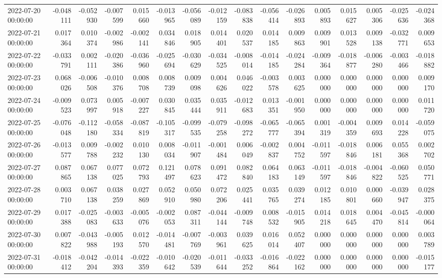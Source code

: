 \begin{tabular}{lrrrrrrrrrrrrrrr}
2022-07-20 00:00:00 & -0.048111 & -0.052930 & -0.007599 & 0.015660 & -0.013965 & -0.056089 & -0.012159 & -0.083838 & -0.056414 & -0.026893 & 0.005893 & 0.015627 & 0.005306 & -0.025636 & -0.024368 \\
2022-07-21 00:00:00 & 0.017364 & 0.010374 & -0.002986 & -0.002141 & 0.034846 & 0.018905 & 0.014401 & 0.020537 & 0.014185 & 0.009863 & 0.009901 & 0.013528 & 0.009138 & -0.032771 & 0.009653 \\
2022-07-22 00:00:00 & -0.033791 & 0.002111 & -0.020386 & -0.036960 & -0.025694 & -0.030629 & -0.034525 & -0.008014 & -0.014185 & -0.024284 & -0.009364 & -0.018877 & -0.006280 & -0.003466 & -0.018882 \\
2022-07-23 00:00:00 & 0.068026 & -0.006508 & -0.010376 & 0.008708 & 0.008739 & 0.009098 & 0.004626 & 0.046022 & -0.003578 & 0.003625 & 0.000000 & 0.000000 & 0.000000 & 0.000000 & 0.009170 \\
2022-07-24 00:00:00 & -0.009523 & 0.073997 & 0.005918 & -0.007227 & 0.030845 & 0.035444 & 0.035911 & -0.012683 & 0.013351 & -0.001950 & 0.000000 & 0.000000 & 0.000000 & 0.000000 & 0.011720 \\
2022-07-25 00:00:00 & -0.076048 & -0.112180 & -0.058334 & -0.087819 & -0.105317 & -0.099535 & -0.079258 & -0.098272 & -0.065777 & -0.065394 & 0.001319 & -0.004359 & 0.009693 & 0.014228 & -0.059075 \\
2022-07-26 00:00:00 & -0.013577 & 0.009788 & -0.002232 & 0.010130 & 0.008034 & -0.011907 & -0.001484 & 0.006049 & -0.002837 & 0.004752 & -0.011597 & -0.018846 & 0.006181 & 0.055368 & 0.002702 \\
2022-07-27 00:00:00 & 0.087865 & 0.067138 & 0.077025 & 0.072793 & 0.121497 & 0.078623 & 0.091472 & 0.082840 & 0.064183 & 0.063149 & -0.011597 & -0.018846 & -0.004822 & -0.060525 & 0.050771 \\
2022-07-28 00:00:00 & 0.003710 & 0.067138 & 0.038259 & 0.027869 & 0.052910 & 0.050980 & 0.072206 & 0.025441 & 0.035765 & 0.039274 & 0.012185 & 0.010801 & 0.000660 & -0.039947 & 0.028375 \\
2022-07-29 00:00:00 & 0.017388 & -0.025083 & -0.003633 & -0.005076 & -0.002053 & 0.087311 & -0.044144 & -0.009748 & 0.008532 & -0.015905 & 0.014218 & 0.018645 & 0.004470 & -0.045814 & -0.000064 \\
2022-07-30 00:00:00 & 0.007822 & -0.043988 & -0.005193 & 0.012570 & -0.014481 & -0.007769 & -0.003961 & 0.039625 & 0.016014 & 0.052407 & 0.000000 & 0.000000 & 0.000000 & 0.000000 & 0.003789 \\
2022-07-31 00:00:00 & -0.018412 & -0.042204 & -0.014393 & -0.022359 & -0.010642 & -0.020539 & -0.011644 & -0.033252 & -0.016864 & -0.022162 & 0.000000 & 0.000000 & 0.000000 & 0.000000 & -0.015177 \\

\end{tabular}
